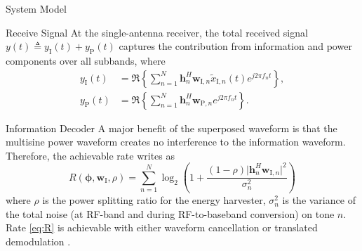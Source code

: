 \documentclass[journal]{IEEEtran}
\begin{document}
\begin{section}{System Model}
		\begin{subsection}{Receive Signal}
			At the single-antenna receiver, the total received signal $y(t) \triangleq y_{\mathrm{I}}(t)+y_\mathrm{P}(t)$ captures the contribution from information and power components over all subbands, where
			\begin{align}
				y_{\mathrm{I}}(t) & = \Re\left\{\sum_{n=1}^N{\boldsymbol{h}_{n}^H}{\boldsymbol{w}_{\mathrm{I},n}\tilde{x}_{\mathrm{I},n}(t)}{e^{j2{\pi}{f_n}{t}}}\right\},\label{eq:y_I}\\
				y_{\mathrm{P}}(t) & = \Re\left\{\sum_{n=1}^N{\boldsymbol{h}_{n}^H}\boldsymbol{w}_{\mathrm{P},n}{e^{j2{\pi}{f_n}{t}}}\right\}.\label{eq:y_P}
			\end{align}
		\end{subsection}


		\begin{subsection}{Information Decoder}
			A major benefit of the superposed waveform is that the multisine power waveform creates no interference to the information waveform. Therefore, the achievable rate writes as
			\begin{equation}\label{eq:R}
				R(\boldsymbol{\phi},\boldsymbol{w}_{\mathrm{I}},\rho) = \sum_{n=1}^N{\log_2\left(1+\frac{(1-\rho)\lvert \boldsymbol{h}_{n}^H\boldsymbol{w}_{\mathrm{I},n} \rvert^2}{\sigma_n^2}\right)}
			\end{equation}
			where $\rho$ is the power splitting ratio for the energy harvester, $\sigma_n^2$ is the variance of the total noise (at RF-band and during RF-to-baseband conversion) on tone $n$. Rate \eqref{eq:R} is achievable with either waveform cancellation or translated demodulation \cite{Clerckx2018b}.
		\end{subsection}



\end{section}
\end{document}
